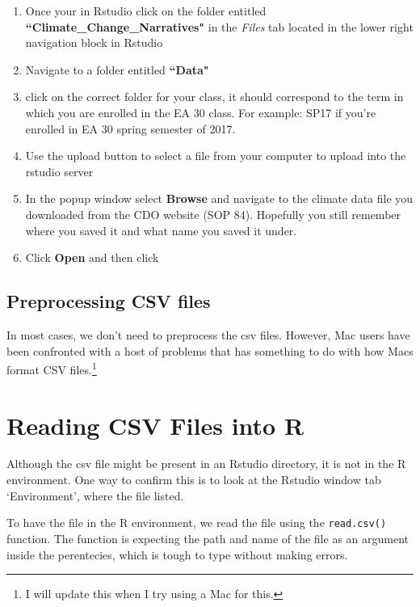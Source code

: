 \documentclass{article}\usepackage[]{graphicx}\usepackage[]{color}
\begin{document}
  \begin{enumerate}
  \item Once your in Rstudio click on the folder entitled \textbf{``Climate\_Change\_Narratives"} in the \textit{Files} tab located in the lower right navigation block in Rstudio
  \item Navigate to a folder entitled \textbf{``Data"} 
  \item click on the correct folder for your class, it should correspond to the term in which you are enrolled in the EA 30 class. For example: SP17 if you're enrolled in EA 30 spring semester of 2017.
  \item Use the upload button to select a file from your computer to upload into the rstudio server
  \item In the popup window select \textbf{Browse} and navigate to the climate data file you downloaded from the CDO website (SOP 84). Hopefully you still remember where you saved it and what name you saved it under. 
  \item Click \textbf{Open} and then click 
  
  \end{enumerate}



\subsection{Preprocessing CSV files}

In most cases, we don't need to preprocess the csv files. However, Mac users have been confronted with a host of problems that has something to do with how Macs format CSV files.\footnote{I will update this when I try using a Mac for this.}


\section{Reading CSV Files into R}

Although the csv file might be present in an Rstudio directory, it is not in the R environment. One way to confirm this is to look at the Rstudio window tab `Environment', where the file listed. 

To have the file in the R environment, we read the file using the \verb!read.csv()! function. The function is expecting the path and name of the file as an argument inside the perentecies, which is tough to type without making errors. 
\end{document}
